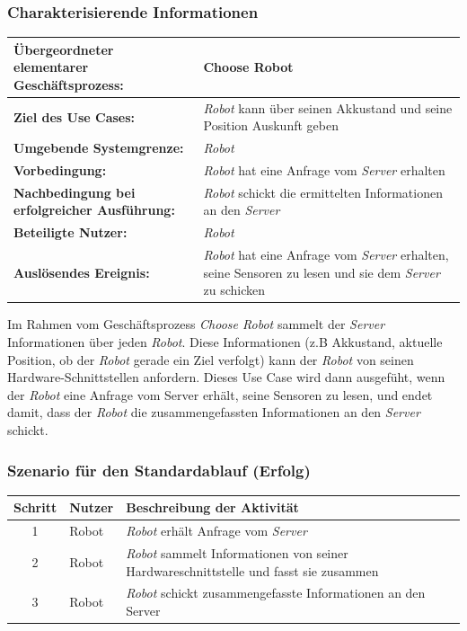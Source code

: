\documentclass[includeheaders]{scrartcl}
\begin{document}
			\subsubsection*{Charakterisierende Informationen}

			\begin{table}[H]
				\centering
				\begin{tabularx}{\textwidth}{@{}p{5cm}X@{}}
				\toprule
				\textbf{Übergeordneter elementarer Geschäftsprozess:} & Choose Robot\\ \midrule
				\textbf{Ziel des Use Cases:} & \emph{Robot} kann über seinen Akkustand und seine Position Auskunft geben\\ \midrule
				\textbf{Umgebende Systemgrenze:} & \emph{Robot} \\ \midrule
				\textbf{Vorbedingung:} & \emph{Robot} hat eine Anfrage vom \emph{Server} erhalten \\ \midrule
				\textbf{Nachbedingung bei erfolgreicher Ausführung:} & \emph{Robot} schickt die ermittelten Informationen an den \emph{Server} \\ \midrule
				\textbf{Beteiligte Nutzer:} & \emph{Robot} \\ \midrule
				\textbf{Auslösendes Ereignis:} & \emph{Robot} hat eine Anfrage vom \emph{Server} erhalten, seine Sensoren zu lesen und sie dem \emph{Server} zu schicken \\
				\bottomrule
				\end{tabularx}
			\end{table}

			Im Rahmen vom Geschäftsprozess \emph{Choose Robot} sammelt der \emph{Server}
			Informationen über jeden \emph{Robot}. Diese Informationen (z.B
			Akkustand, aktuelle Position, ob der \emph{Robot} gerade ein Ziel verfolgt)
			kann der \emph{Robot} von seinen Hardware-Schnittstellen anfordern. Dieses
			Use Case wird dann ausgefüht, wenn der \emph{Robot} eine Anfrage vom
			Server erhält, seine Sensoren zu lesen, und endet damit, dass der \emph{Robot}
			die zusammengefassten Informationen an den \emph{Server} schickt.

			\subsubsection*{Szenario für den Standardablauf (Erfolg)}

			\begin{table}[H]
				\centering
				\begin{tabularx}{\textwidth}{@{}cp{2cm}X@{}}
				\toprule
				Schritt & Nutzer & Beschreibung der Aktivität \\ \midrule
				1 & Robot & \emph{Robot} erhält Anfrage vom \emph{Server} \\
				2 & Robot & \emph{Robot} sammelt Informationen von seiner Hardwareschnittstelle und fasst sie zusammen \\
				3 & Robot & \emph{Robot} schickt zusammengefasste Informationen an den Server \\
				\bottomrule
				\end{tabularx}
			\end{table}
\end{document}
